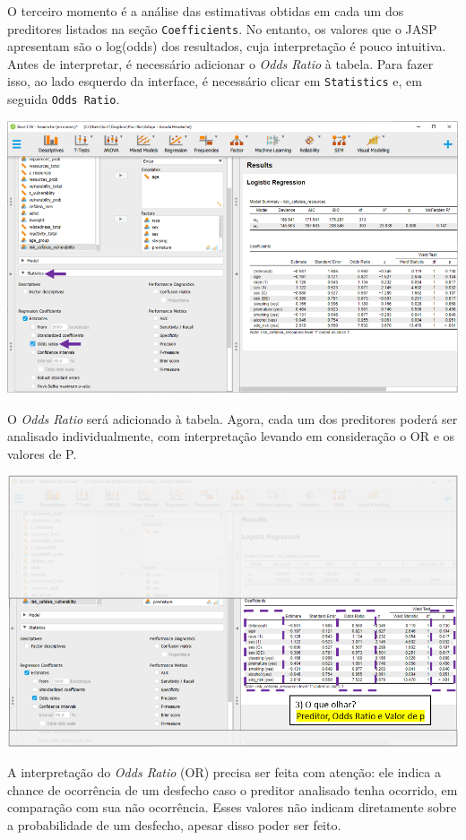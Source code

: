 \documentclass[
]{book}
\begin{document}
O terceiro momento é a análise das estimativas obtidas em cada um dos
preditores listados na seção \texttt{Coefficients}. No entanto, os
valores que o JASP apresentam são o log(odds) dos resultados, cuja
interpretação é pouco intuitiva. Antes de interpretar, é necessário
adicionar o \emph{Odds Ratio} à tabela. Para fazer isso, ao lado
esquerdo da interface, é necessário clicar em \texttt{Statistics} e, em
seguida \texttt{Odds\ Ratio}.

\includegraphics{./img/cap_logistica_resultado_3.png}

O \emph{Odds Ratio} será adicionado à tabela. Agora, cada um dos
preditores poderá ser analisado individualmente, com interpretação
levando em consideração o OR e os valores de P.

\includegraphics{./img/cap_logistica_resultado_4.png}

A interpretação do \emph{Odds Ratio} (OR) precisa ser feita com atenção:
ele indica a chance de ocorrência de um desfecho caso o preditor
analisado tenha ocorrido, em comparação com sua não ocorrência. Esses
valores não indicam diretamente sobre a probabilidade de um desfecho,
apesar disso poder ser feito.
\end{document}
